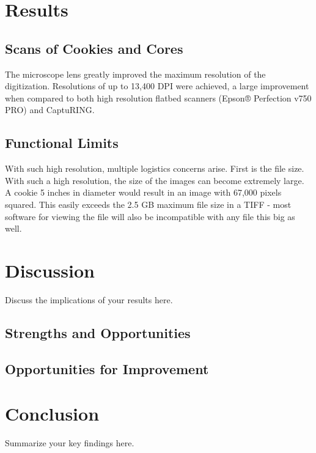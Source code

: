 \documentclass[a4paper,12pt]{article}
\begin{document}


\section{Results}
\subsection{Scans of Cookies and Cores}
The microscope lens greatly improved the maximum resolution of the digitization. Resolutions of up to 13,400 DPI were achieved, a large improvement when compared to 
both high resolution flatbed scanners (Epson® Perfection v750 PRO) and CaptuRING. 

\subsection{Functional Limits}
With such high resolution, multiple logistics concerns arise. First is the file size. With such a high resolution, the size of the images can become extremely large. A cookie
5 inches in diameter would result in an image with 67,000 pixels squared. This easily exceeds the 2.5 GB maximum file size in a TIFF - most software for viewing the file will also 
be incompatible with any file this big as well. 


\section{Discussion}
Discuss the implications of your results here.

\subsection{Strengths and Opportunities}

\subsection{Opportunities for Improvement}

\section{Conclusion}
Summarize your key findings here.



\end{document}
